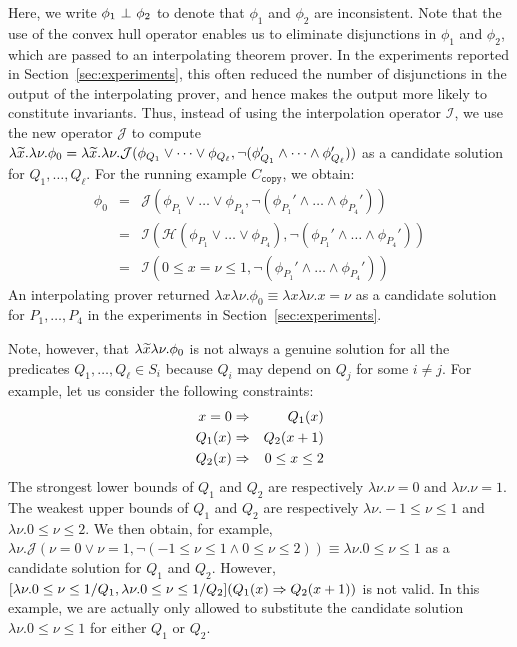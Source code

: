 Here, we write \(\phi_1 \ \bot\  \phi_2\) to denote that \(\phi_1\) and
\(\phi_2\) are inconsistent.  Note that the use of the convex hull
operator enables us to eliminate disjunctions in \(\phi_1\) and
\(\phi_2\), which are passed to an interpolating theorem prover.
In the experiments reported in Section~\ref{sec:experiments}, this often
reduced the number of disjunctions in the output of the interpolating
prover, and hence makes the output more likely to constitute invariants.
%
Thus, instead of using the interpolation operator \(\mathcal{I}\), we
use the new operator \(\mathcal{J}\) to compute \(\lambda\widetilde{x}.\lambda
\nu.\phi_0=\lambda\widetilde{x}.\lambda \nu.\mathcal{J}(\phi_{Q_1} \lor \dots
\lor \phi_{Q_{\ell}},\neg (\phi_{Q_1}' \land \dots \land
\phi_{Q_{\ell}}'))\) as a candidate solution for \(Q_1,\dots,Q_{\ell}\).
 For the running example \(C_{\texttt{copy}}\), we obtain:
\begin{eqnarray*}
\phi_0 &=& \mathcal{J}(\phi_{P_1} \lor \dots \lor \phi_{P_4},\neg (\phi_{P_1}' \land \dots \land \phi_{P_4}')) \\
&=& \mathcal{I}(\mathcal{H}(\phi_{P_1} \lor \dots \lor \phi_{P_4}),\neg (\phi_{P_1}' \land \dots \land \phi_{P_4}')) \\
&=& \mathcal{I}(0 \leq x=\nu \leq 1,\neg (\phi_{P_1}' \land \dots \land \phi_{P_4}'))
\end{eqnarray*}
An interpolating prover returned \(\lambda x \lambda \nu.\phi_0 \equiv
\lambda x \lambda \nu.x=\nu\) as a candidate solution for
\(P_1,\dots,P_4\) in the experiments in Section~\ref{sec:experiments}.

Note, however, that \(\lambda \widetilde{x} \lambda \nu.\phi_0\) is not always
a genuine solution for all the predicates \(Q_1,\dots,Q_{\ell} \in S_i\)
because \(Q_i\) may depend on \(Q_j\) for some \(i \neq j\).  For
example, let us consider the following constraints:
\begin{eqnarray*}
x=0 &\Rightarrow& Q_1(x) \\
Q_1(x) &\Rightarrow& Q_2(x+1) \\
Q_2(x) &\Rightarrow& 0 \leq x \leq 2
\end{eqnarray*}
The strongest lower bounds of \(Q_1\) and \(Q_2\) are respectively
\(\lambda \nu.\nu=0\) and \(\lambda \nu.\nu=1\).  The weakest upper
bounds of \(Q_1\) and \(Q_2\) are respectively \(\lambda \nu.-1 \leq \nu
\leq 1\) and \(\lambda \nu.0 \leq \nu \leq 2\).  We then obtain, for
example, \(\lambda \nu.\mathcal{J}(\nu=0 \lor \nu=1,\neg (-1 \leq \nu
\leq 1 \land 0 \leq \nu \leq 2)) \equiv \lambda \nu.0 \leq \nu \leq 1\)
as a candidate solution for \(Q_1\) and \(Q_2\).  However, \([\lambda
\nu.0 \leq \nu \leq 1/Q_1,\lambda \nu.0 \leq \nu \leq 1/Q_2](Q_1(x)
\Rightarrow Q_2(x+1))\) is not valid.  In this example, we are actually only
allowed to substitute the candidate solution \(\lambda \nu.0 \leq \nu
\leq 1\) for either \(Q_1\) or \(Q_2\).

